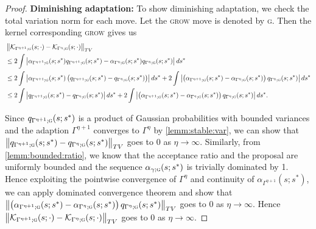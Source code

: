 \documentclass[
12pt]{article}
\begin{document}
	\begin{proof}
		\textbf{Diminishing adaptation:}
		To show diminishing adaptation, we check the total variation norm for each move. Let the \textsc{grow} move is denoted by \textsc{g}. Then the kernel corresponding \textsc{grow} gives us
		\begin{align*}
			&\left\|\mathcal{K}_{\Gamma^{\eta+1};\textsc{g}}(s;\cdot)-\mathcal{K}_{\Gamma^{\eta};\textsc{g}}(s;\cdot)\right\|_{TV}\\
			&\le 2\int \left|\alpha_{\Gamma^{\eta+1};\textsc{g}}(s;s^{\ast})q_{\Gamma^{\eta+1};\textsc{g}}(s;s^{\ast}) - \alpha_{\Gamma^{\eta};\textsc{g}}(s;s^{\ast})q_{\Gamma^{\eta};\textsc{g}}(s;s^{\ast})\right|ds^{\ast}\\
			&\le 2\int \left|\alpha_{\Gamma^{\eta+1};\textsc{g}}(s;s^{\ast})\left(q_{\Gamma^{\eta+1};\textsc{g}}(s;s^{\ast}) - q_{\Gamma^{\eta};\textsc{g}}(s;s^{\ast})\right)\right|ds^{\ast} 
			+ 2\int \left|\left(\alpha_{\Gamma^{\eta+1};\textsc{g}}(s;s^{\ast})-\alpha_{\Gamma^{\eta};\textsc{g}}(s;s^{\ast})\right)q_{\Gamma^{\eta};\textsc{g}}(s;s^{\ast})\right|ds^{\ast}\\
			&\le 2\int \left|q_{\Gamma^{\eta+1};\textsc{g}}(s;s^{\ast}) - q_{\Gamma^{\eta};\textsc{g}}(s;s^{\ast})\right|ds^{\ast} 
			+ 2\int \left|\left(\alpha_{\Gamma^{\eta+1};\textsc{g}}(s;s^{\ast})-\alpha_{\Gamma^{\eta};\textsc{g}}(s;s^{\ast})\right)q_{\Gamma^{\eta};\textsc{g}}(s;s^{\ast})\right|ds^{\ast}.
		\end{align*}
		
		Since $q_{\Gamma^{\eta+1};\textsc{g}}(s;s^{\ast})$ is a product of Gaussian probabilities with bounded variances and the adaption $\Gamma^{\eta+1}$ converges to $\Gamma^{\eta}$ by \cref{lemm:stable:var}, we can show that $\left\|q_{\Gamma^{\eta+1};\textsc{g}}(s;s^{\ast})-q_{\Gamma^{\eta};\textsc{g}}(s;s^{\ast})\right\|_{TV}$ goes to 0 as $\eta \to \infty$. Similarly, from \cref{lemm:bounded:ratio}, we know that the acceptance ratio and the proposal are uniformly bounded and the sequence $\alpha_{\gamma;\textsc{g}}(s;s^{\ast})$ is trivially dominated by 1. Hence exploiting the pointwise convergence of $\Gamma^{\eta}$ and continuity of $\alpha_{\Gamma^{\eta+1}}(s;s^{\ast})$, we can apply dominated convergence theorem and show that $\left\|\left(\alpha_{\Gamma^{\eta+1};\textsc{g}}(s;s^{\ast})-\alpha_{\Gamma^{\eta};\textsc{g}}(s;s^{\ast})\right)q_{\Gamma^{\eta};\textsc{g}}(s;s^{\ast})\right\|_{TV}$ goes to 0 as $\eta \to \infty$. Hence $\left\|\mathcal{K}_{\Gamma^{\eta+1};\textsc{g}}(s;\cdot)-\mathcal{K}_{\Gamma^{\eta};\textsc{g}}(s;\cdot)\right\|_{TV}$ goes to 0 as $\eta\to \infty$.
		

\end{proof}
\end{document}
